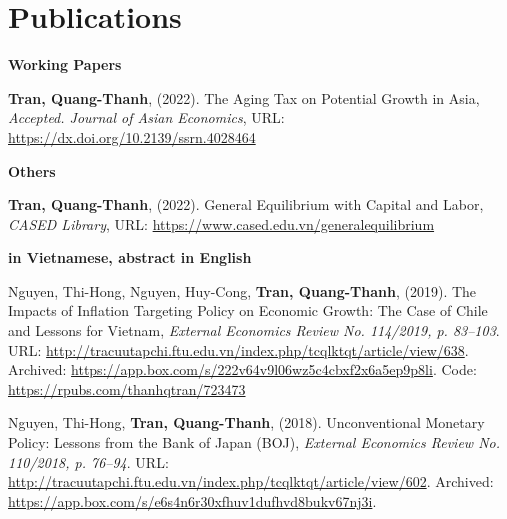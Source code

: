 
\section{\sc Publications}
{\bf Working Papers}
\vspace*{.05in}
\begin{etaremune}[]
\item
  {\bf Tran, Quang-Thanh},
  (2022).
  {The Aging Tax on Potential Growth in Asia},
  {\it Accepted. Journal of Asian Economics},
  {URL: \url{https://dx.doi.org/10.2139/ssrn.4028464}}
\end{etaremune}

{\bf Others}
\vspace*{.05in}
\vspace*{.05in}
\begin{etaremune}[]
\item
  {\bf Tran, Quang-Thanh},
  (2022).
  {General Equilibrium with Capital and Labor},
  {\it CASED Library},
  {URL: \url{https://www.cased.edu.vn/generalequilibrium}}
\end{etaremune}

{\bf in Vietnamese, abstract in English}
\vspace*{.05in}
\begin{etaremune}[]
	\item
	Nguyen, Thi-Hong,
	Nguyen, Huy-Cong,
	{\bf Tran, Quang-Thanh},
	(2019).
	{The Impacts of Inflation Targeting Policy on Economic Growth: The Case of Chile and Lessons for Vietnam},
	{\it External Economics Review No. 114/2019, p. 83--103}.
	{URL: \url{http://tracuutapchi.ftu.edu.vn/index.php/tcqlktqt/article/view/638}}.
	{Archived: \url{https://app.box.com/s/222v64v9l06wz5c4cbxf2x6a5ep9p8li}. Code: \url{https://rpubs.com/thanhqtran/723473}}

	\item 
	Nguyen, Thi-Hong,
	{\bf Tran, Quang-Thanh},
	(2018).
	Unconventional Monetary Policy: Lessons from the Bank of Japan (BOJ),
	{\it External Economics Review No. 110/2018, p. 76--94}.
	{URL: \url{http://tracuutapchi.ftu.edu.vn/index.php/tcqlktqt/article/view/602}}. 
	{Archived: \url{https://app.box.com/s/e6s4n6r30xfhuv1dufhvd8bukv67nj3i}}.
\end{etaremune}


